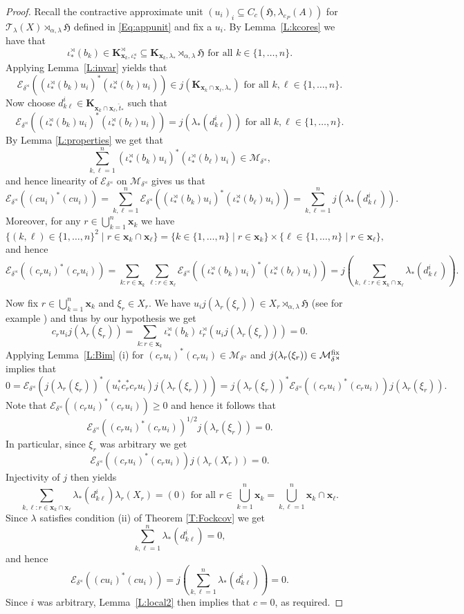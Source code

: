 \documentclass[11pt,final]{amsart}
\numberwithin{equation}{section}
\theoremstyle{plain}
\theoremstyle{definition}
\theoremstyle{remark}
\newcommand{\E}{{\mathcal{E}}}
\newcommand{\M}{{\mathcal{M}}}
\newcommand{\T}{{\mathcal{T}}}
\def\al{\alpha}
\def\de{\delta}
\def\io{\iota}
\def\la{\lambda}
\newcommand{\fH}{{\mathfrak{H}}}
\newcommand{\foral}{\text{ for all }}
\newcommand{\bo}[1]{\mathbf{#1}} %
\begin{document}
\begin{proof}
Recall the contractive approximate unit $(u_i)_i \subseteq C_c(\fH,\la_{e_P}(A))$ for $\T_\la(X)\rtimes_{\al,\la}\fH$ defined in \eqref{Eq:appunit} and fix a $u_i$. By Lemma~\ref{L:kcores} we have that 
\[
\io^\rtimes_\ast(b_k) \in \bo{K}^{\rtimes}_{\bo{x}_k,\io^\rtimes_\ast} \subseteq \bo{K}_{\bo{x}_k,\la_\ast}\rtimes_{\al,\la}\fH \foral k\in \{1,\dots, n\}.
\]
Applying Lemma~\ref{L:invar} yields that
\[
\E_{\de^{\rtimes}}((\io^\rtimes_\ast(b_k) u_i)^*(\io^\rtimes_\ast(b_\ell) u_i))
\in j(\bo{K}_{\bo{x}_k\cap\bo{x}_\ell,\la_\ast}) \foral k,\ell\in \{1,\dots, n\}.
\]
Now choose $d_{k\ell}^{i}\in\bo{K}_{\bo{x}_k\cap\bo{x}_\ell,\widehat t_\ast}$ such that
\[
\E_{\de^{\rtimes}}((\io^\rtimes_\ast(b_k) u_i)^*(\io^\rtimes_\ast(b_\ell) u_i))
=j(\la_\ast(d_{k\ell}^{i})) \foral k,\ell\in \{1,\dots, n\}.
\]
By Lemma \ref{L:properties} we get that 
\[
\sum_{k,\ell=1}^n(\io^\rtimes_\ast(b_k) u_i)^*(\io^\rtimes_\ast(b_\ell) u_i) \in \M_{\de^{\rtimes}},
\]
and hence linearity of $\E_{\de^{\rtimes}}$ on $\M_{\de^{\rtimes}}$ gives us that
\[
\E_{\de^{\rtimes}}((c u_i)^*(c u_i))
=
\sum_{k,\ell=1}^n \E_{\de^{\rtimes}}((\io^\rtimes_\ast(b_k) u_i)^*(\io^\rtimes_\ast(b_\ell) u_i))
=\sum_{k,\ell=1}^n j(\la_\ast(d_{k\ell}^{i})).
\]
Moreover, for any $r\in\bigcup_{k=1}^n\bo{x}_k$ we have
\[
\{(k,\ell)\in \{1,\dots, n\}^2\mid r\in\bo{x}_k\cap\bo{x}_\ell\}
=
\{k\in \{1,\dots, n\} \mid r\in \bo{x}_k\} \times \{\ell \in \{1,\dots, n\} \mid r\in \bo{x}_\ell\},
\]
and hence
\[
\E_{\de^{\rtimes}}((c_ru_i)^*(c_ru_i))=\sum_{k:r\in \bo{x}_k} \sum_{\ell: r\in \bo{x}_\ell} \E_{\de^{\rtimes}}((\io^\rtimes_\ast(b_k) u_i)^*(\io^\rtimes_\ast(b_\ell) u_i))
= j\left(\sum_{k,\ell :r\in \bo{x}_k \cap \bo{x}_\ell} \la_\ast(d_{k\ell}^{i})\right).
\]

Now fix $r\in\bigcup_{k=1}^n\bo{x}_k$ and $\xi_r\in X_r$. We have $u_i j(\la_r(\xi_r))\in X_r\rtimes_{\al,\la}\fH$ (see for example \cite[Appendix A, Remark A.8]{EKQR06}) and thus by our hypothesis we get
\[
c_ru_i j(\la_r(\xi_r))=\sum_{k:r\in\bo{x}_k}\io^\rtimes_\ast(b_k)\,
\io^\rtimes_r(u_i j(\la_r(\xi_r)))=0.
\]
Applying Lemma~\ref{L:Bim} (i) for $(c_r u_i)^* (c_r u_i) \in \M_{\de^{\rtimes}}$ and $j(\la_r(\xi_r))\in \M^{\rm fix}_{\de^{\rtimes}}$ implies that
\[
0
=\E_{\de^{\rtimes}} (j(\la_r(\xi_r))^* (u_i^* c_r^* c_r u_i) j(\la_r(\xi_r)))
=j(\la_r(\xi_r))^* \E_{\de^{\rtimes}} ((c_ru_i)^*(c_ru_i))j(\la_r(\xi_r)).
\]
Note that $\E_{\de^{\rtimes}}((c_ru_i)^*(c_ru_i))\geq0$ and hence it follows that
\[
\E_{\de^{\rtimes}}((c_ru_i)^*(c_ru_i))^{1/2}j(\la_r(\xi_r))=0.
\]
In particular, since $\xi_r$ was arbitrary we get
\[
\E_{\de^{\rtimes}}((c_ru_i)^*(c_ru_i))j(\la_r(X_r))=0.
\]
Injectivity of $j$ then yields
\[
\sum_{k,\ell :r\in\bo{x}_k\cap\bo{x}_\ell}
\la_\ast(d_{k\ell}^{i})\la_r(X_r)=(0)
\foral r\in\bigcup_{k=1}^n\bo{x}_k=\bigcup_{k,\ell=1}^n\bo{x}_k\cap \bo{x}_\ell.
\]
Since $\la$ satisfies condition (ii) of
Theorem \ref{T:Fockcov} we get
\[
\sum_{k,\ell=1}^n\la_\ast(d_{k\ell}^{i})=0,
\]
and hence
\[
\E_{\de^{\rtimes}}((c u_i)^*(c u_i))=j\left(\sum_{k,\ell=1}^n\la_\ast(d_{k\ell}^{i})\right)=0.
\]
Since $i$ was arbitrary, Lemma~\ref{L:local2} then implies that $c=0$, as required.
\end{proof}
\end{document}
